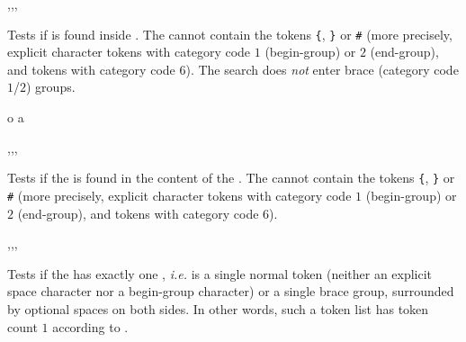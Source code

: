 \documentclass[oneside]{book}
\begin{document}
\begin{function}{\TlIfIn,\TlIfInT,\TlIfInF,\TlIfInTF}
\begin{syntax}
  
   
   
    
\end{syntax}
Tests if  is found inside .
The  cannot contain the tokens \verb|{|, \verb|}| or \verb|#|
(more precisely, explicit character tokens with category code $1$
(begin-group) or $2$ (end-group), and tokens with category code $6$).
The search does \emph{not} enter brace (category code $1$/$2$) groups.
\begin{demohigh}
 {o} {} {}
 {a} {} {}
\end{demohigh}
\end{function}

\begin{function}{\TlVarIfIn,\TlVarIfInT,\TlVarIfInF,\TlVarIfInTF}
\begin{syntax}
  
   
   
    
\end{syntax}
Tests if the  is found in the content of the
. The  cannot contain
the tokens \verb|{|, \verb|}| or \verb|#|
(more precisely, explicit character tokens with category code $1$
(begin-group) or $2$ (end-group), and tokens with category code $6$).
\begin{demohigh}
\TlSet {}
\TlVarIfInTF {} {} {}
\TlVarIfInTF {} {} {}
\end{demohigh}
\end{function}

\begin{function}{\TlIfSingle,\TlIfSingleT,\TlIfSingleF,\TlIfSingleTF}
\begin{syntax}
 
  
  
   
\end{syntax}
Tests if the  has exactly one , \emph{i.e.} is
a single normal token (neither an explicit space character nor a
begin-group character) or a single brace group, surrounded by
optional spaces on both sides. In other words, such a token list has
token count $1$ according to .
\begin{demohigh}
 {} {}
 {} {}
\end{demohigh}
\end{function}
\end{document}
